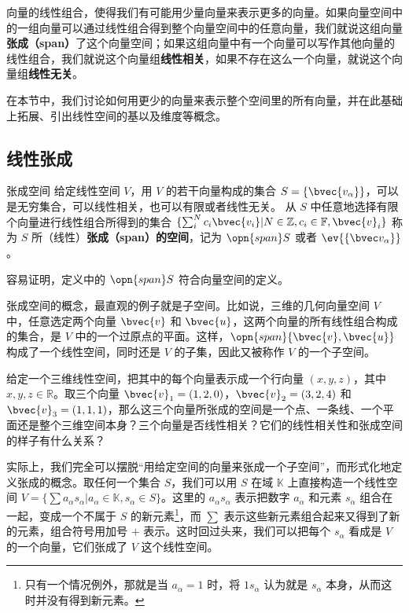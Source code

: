 

向量的线性组合，使得我们有可能用少量向量来表示更多的向量。如果向量空间中的一组向量可以通过线性组合得到整个向量空间中的任意向量，我们就说这组向量\textbf{张成（span）}了这个向量空间；如果这组向量中有一个向量可以写作其他向量的线性组合，我们就说这个向量组\textbf{线性相关}，如果不存在这么一个向量，就说这个向量组\textbf{线性无关}。

在本节中，我们讨论如何用更少的向量来表示整个空间里的所有向量，并在此基础上拓展、引出线性空间的基以及维度等概念。

\subsection{线性张成}

\begin{definition}{张成空间}\label{def_VecSpn_1}
给定线性空间 $V$，用 $V$ 的若干向量构成的集合 $S=\{\bvec{v_\alpha}\}$，可以是无穷集合，可以线性相关，也可以有限或者线性无关。 从 $S$ 中任意地选择有限个向量进行线性组合所得到的集合 $\{\sum_i^N c_i\bvec{v_i}|N\in\mathbb{Z}, c_i\in\mathbb{F}, \bvec{v}_i\}$ 称为 $S$ 所（线性）\textbf{张成（span）的空间}，记为 $\opn{span} S$ 或者 $\ev{\{\bvec v_\alpha\}}$。
\end{definition}
容易证明，定义中的 $\opn{span} S$ 符合向量空间的定义。

张成空间的概念，最直观的例子就是子空间。比如说，三维的几何向量空间 $V$ 中，任意选定两个向量 $\bvec{v}$ 和 $\bvec{u}$，这两个向量的所有线性组合构成的集合，是 $V$ 中的一个过原点的平面。这样，$\opn{span}\{\bvec{v}, \bvec{u}\}$ 构成了一个线性空间，同时还是 $V$ 的子集，因此又被称作 $V$ 的一个子空间。

\begin{exercise}{}\label{exe_VecSpn_1}
给定一个三维线性空间，把其中的每个向量表示成一个行向量 $(x,y,z)$，其中 $x,y,z\in\mathbb{R}$。取三个向量 $\bvec{v}_1=(1,2,0)$，$\bvec{v}_2=(3,2,4)$ 和 $\bvec{v}_3=(1,1,1)$，那么这三个向量所张成的空间是一个点、一条线、一个平面还是整个三维空间本身？三个向量是否线性相关？它们的线性相关性和张成空间的样子有什么关系？
\end{exercise}

实际上，我们完全可以摆脱“用给定空间的向量来张成一个子空间”，而形式化地定义张成的概念。取任何一个集合 $S$，我们可以用 $S$ 在域 $\mathbb{K}$ 上直接构造一个线性空间 $V=\{\sum a_\alpha s_\alpha|a_\alpha\in\mathbb{K}, s_\alpha\in S\}$。这里的 $a_\alpha s_\alpha$ 表示把数字 $a_\alpha$ 和元素 $s_\alpha$ 组合在一起，变成一个不属于 $S$ 的新元素\footnote{只有一个情况例外，那就是当 $a_\alpha=1$ 时，将 $1s_\alpha$ 认为就是 $s_\alpha$ 本身，从而这时并没有得到新元素。}，而 $\sum$ 表示这些新元素组合起来又得到了新的元素，组合符号用加号 $+$ 表示。这时回过头来，我们可以把每个 $s_\alpha$ 看成是 $V$ 的一个向量，它们张成了 $V$ 这个线性空间。

